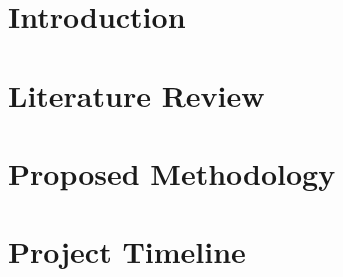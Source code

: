 \documentclass[12pt]{article}
\numberwithin{equation}{section}
\begin{document}

\clearpage
\setcounter{page}{2}


\newpage


\newpage


\newpage

\tableofcontents

\newpage
\listoffigures

\newpage
\listoftables

\newpage
{}

\section{Introduction}


\section{Literature Review}


\section{Proposed Methodology}


\section{Project Timeline}


\newpage


\end{document}

